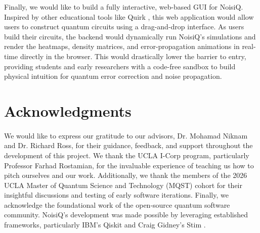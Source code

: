 \documentclass[10pt,twocolumn]{article}
\begin{document}
    Finally, we would like to build a fully interactive, web-based GUI for NoisiQ. 
Inspired by other educational tools like Quirk \cite{quirk}, this web application would allow users to construct quantum circuits using a drag-and-drop interface. 
As users build their circuits, the backend would dynamically run NoisiQ's simulations and render the heatmaps, density matrices, and error-propagation animations in real-time directly in the browser. 
This would drastically lower the barrier to entry, providing students and early researchers with a code-free sandbox to build physical intuition for quantum error correction and noise propagation.

\section*{Acknowledgments}
\label{sec:acknowledgments}
\paragraph{}
    We would like to express our gratitude to our advisors, Dr. Mohamad Niknam and Dr. Richard Ross, for their guidance, feedback, and support throughout the development of this project. 
We thank the UCLA I-Corp program, particularly Professor Farhad Rostamian, for the invaluable experience of teaching us how to pitch ourselves and our work.
Additionally, we thank the members of the 2026 UCLA Master of Quantum Science and Technology (MQST) cohort for their insightful discussions and testing of early software iterations. 
Finally, we acknowledge the foundational work of the open-source quantum software community. 
NoisiQ's development was made possible by leveraging established frameworks, particularly IBM's Qiskit \cite{qiskit2024} and Craig Gidney's Stim \cite{stim2021}.

\end{document}
